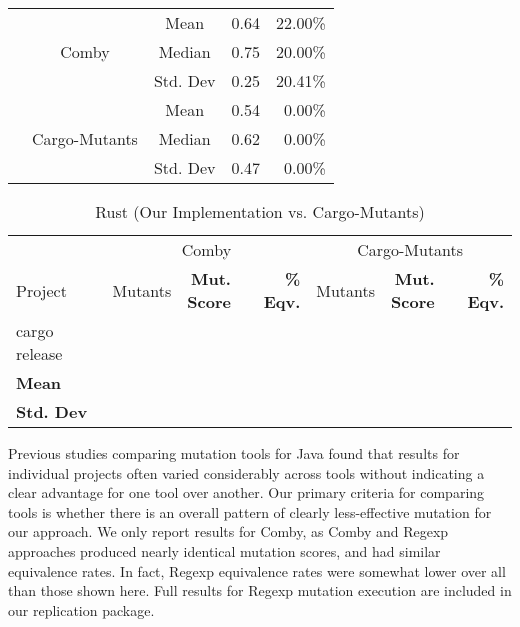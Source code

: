 \documentclass[sigconf,review, anonymous]{acmart}
\begin{document}
\begin{table}[htbp]
{\begin{tabular}{|c|c|r|r|r|r|}
 & \multirow{3}{*}{Comby} & \multicolumn{2}{c|}{Mean} & 0.64 & 22.00\%\\\cline{3-6}
    &   &  \multicolumn{2}{c|}{Median} & 0.75 & 20.00\% \\\cline{3-6}
    &   &  \multicolumn{2}{c|}{Std. Dev} & 0.25 & 20.41\% \\\cline{2-6}

 & \multirow{3}{*}{Cargo-Mutants} & \multicolumn{2}{c|}{Mean} & 0.54 & 0.00\%\\\cline{3-6}
    &   &  \multicolumn{2}{c|}{Median} & 0.62 & 0.00\% \\\cline{3-6}
    &   &  \multicolumn{2}{c|}{Std. Dev} & 0.47 & 0.00\%\\ \hline
    
    
\end{tabular}
}
\end{table}



\begin{table}[htbp]
\centering
{\small
\caption{Rust (Our Implementation vs. Cargo-Mutants)}
\label{tab:table_rust2}
\begin{tabularx}{\columnwidth}{X|crr|crr}
\hline
        & \multicolumn{3}{c|}{Comby}  & \multicolumn{3}{c}{Cargo-Mutants} \\ 
Project & Mutants & \makecell{\textbf{Mut.} \\ \textbf{Score}} & \textbf{\% Eqv.} & Mutants & \makecell{\textbf{Mut.} \\ \textbf{Score}} & \textbf{\% Eqv.} \\[1ex]\midrule
\hline
cargo release & \\

\textbf{Mean}   &  \\
\textbf{Std. Dev} &  \\
\end{tabularx}
}
\end{table}

Previous studies comparing mutation tools for Java
\cite{MajorPIT,gopinath2017does,CommACMJavaTool} found that results
for individual projects often varied considerably across tools without
indicating a clear advantage for one tool over another.  Our primary
criteria for comparing tools is whether there is an overall pattern of
clearly less-effective mutation for our approach.  We only report
results for Comby, as Comby and Regexp approaches produced nearly
identical mutation scores, and had similar equivalence rates.  In
fact, Regexp equivalence rates were somewhat lower over all than those
shown here.  Full results for Regexp mutation execution are included
in our replication package.
\end{document}
